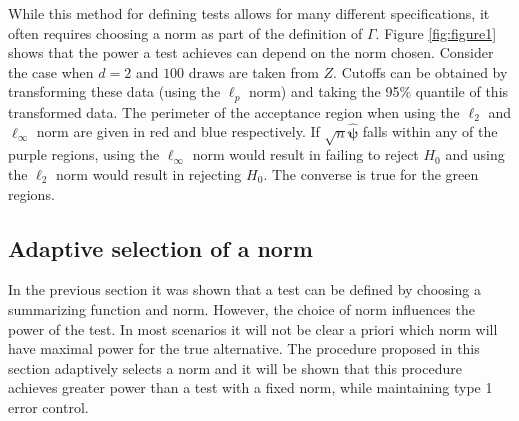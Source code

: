 \documentclass{article}
\begin{document}


While this method for defining tests allows for many different specifications, it often requires choosing a norm as part of the definition of $\Gamma$.  Figure \ref{fig:figure1} shows that the power a test achieves can depend on the norm chosen.  Consider the case when $d = 2$ and $100$ draws are taken from $Z$.  Cutoffs can be obtained by transforming these data (using the $\ell_p$ norm) and taking the 95\% quantile of this transformed data. The perimeter of the acceptance region when using the $\ell_2$ and $\ell_{\infty}$ norm are given in red and blue respectively. If $\sqrt{n}\hat{\boldsymbol{\psi}}$ falls within any of the purple regions, using the $\ell_\infty$ norm would result in failing to reject $H_0$ and using the $\ell_2$ norm would result in rejecting $H_0$.  The converse is true for the green regions.  

\subsection{Adaptive selection of a norm}
In the previous section it was shown that a test can be defined by choosing a summarizing function and norm. However, the choice of norm influences the power of the test. In most scenarios it will not be clear a priori which norm will have maximal power for the true alternative. The procedure proposed in this section adaptively selects a norm and it will be shown that this procedure achieves greater power than a test with a fixed norm, while maintaining type 1 error control.  
\end{document}
